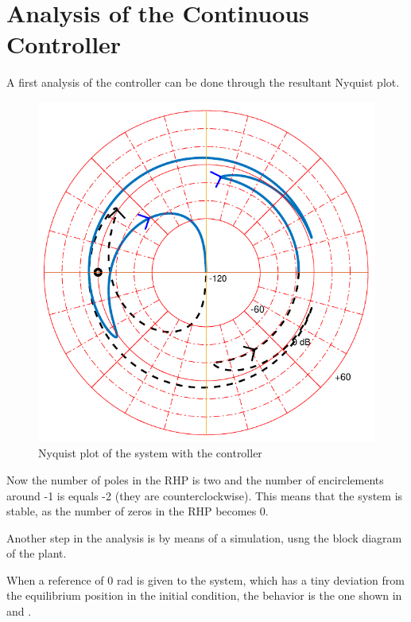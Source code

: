 \section{Analysis of the Continuous Controller}\label{analysisController}
A first analysis of the controller can be done through the resultant Nyquist plot.

\begin{figure}[H] 
	\centering 
	\includegraphics[scale=0.46]{figures/nyquistController}	
	\caption{Nyquist plot of the system with the controller}
	\label{nyquistController}
\end{figure}

Now the number of poles in the RHP is two and the number of encirclements around -1 is equals -2 (they are counterclockwise). This means that the system is stable, as the number of zeros in the RHP becomes 0.

Another step in the analysis is by means of a simulation, usng the block diagram of the plant.

When a reference of 0 rad is given to the system, which has a tiny deviation from the equilibrium position in the initial condition, the behavior is the one shown in  and .

